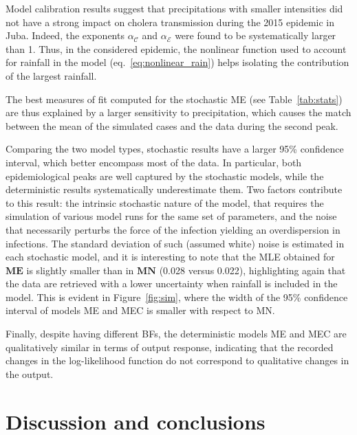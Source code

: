 Model calibration results suggest that precipitations with smaller intensities did not have a strong impact on cholera transmission during the 2015 epidemic in Juba. Indeed, the exponents $\alpha_{\mathcal{C}}$ and $\alpha_{\mathcal{E}}$ were found to be systematically larger than 1. %
  Thus, in the considered epidemic, the nonlinear function used to account for rainfall in the model (eq.~\ref{eq:nonlinear_rain}) helps isolating the contribution of the largest rainfall.

The best measures of fit computed for the stochastic \textsc{ME} (see Table~\ref{tab:stats}) are thus explained by a larger sensitivity to precipitation, which causes the match between the mean of the simulated cases and the data during the second peak.

Comparing the two model types, stochastic results have a larger 95\% confidence interval, which better encompass most of the data. In particular, both epidemiological peaks are well captured by the stochastic models, while the deterministic results systematically underestimate them. Two factors contribute to this result: the intrinsic stochastic nature of the model, that requires the simulation of various model runs for the same set of parameters, and the noise that necessarily perturbs the force of the infection yielding an overdispersion in infections. The standard deviation of such (assumed white) noise is estimated in each stochastic model, and it is interesting to note that the MLE obtained for $\mathbf{ME}$ is slightly smaller than in $\mathbf{MN}$ (0.028 versus 0.022), highlighting again that the data are retrieved with a lower uncertainty when rainfall is included in the model. This is evident in Figure~\ref{fig:sim}, where the width of the 95\% confidence interval of models \textsc{ME} and \textsc{MEC} is smaller with respect to \textsc{MN}.

Finally, despite having different BFs, the deterministic models \textsc{ME} and \textsc{MEC} are qualitatively similar in terms of output response, indicating that the recorded changes in the log-likelihood function do not correspond to qualitative changes in the output.

\section{Discussion and conclusions}
\label{sec:disc}



